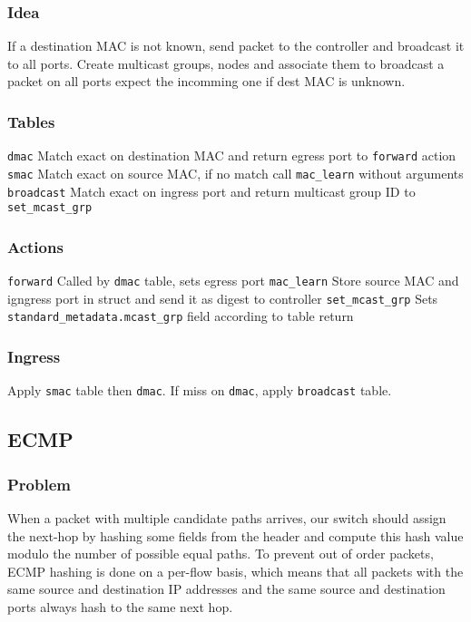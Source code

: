 \documentclass[a4paper, fontsize=8pt, landscape, DIV=1]{scrartcl}
\begin{document}
\begin{multicols*}{4}
  \subsubsection{Idea}
  If a destination MAC is not known, send packet to the controller and broadcast
  it to all ports. Create multicast groups, nodes and associate them to broadcast
  a packet on all ports expect the incomming one if dest MAC is unknown.

  \subsubsection{Tables} 
  \begin{outline}
  \1 \texttt{dmac}
    \2 Match exact on destination MAC and return egress port to \texttt{forward} action
  \1 \texttt{smac}
    \2 Match exact on source MAC, if no match call \texttt{mac\_learn} without arguments
  \1 \texttt{broadcast}
    \2 Match exact on ingress port and return multicast group ID to \texttt{set\_mcast\_grp}
  \end{outline}
  
  \subsubsection{Actions}
  \begin{outline}
  \1 \texttt{forward}
    \2 Called by \texttt{dmac} table, sets egress port
  \1 \texttt{mac\_learn}
    \2 Store source MAC and igngress port in struct and send it as digest to controller
  \1 \texttt{set\_mcast\_grp}
    \2 Sets \texttt{standard\_metadata.mcast\_grp} field according to table return
    
  \end{outline}

  \subsubsection{Ingress} 
  Apply \texttt{smac} table then \texttt{dmac}. If miss on \texttt{dmac}, apply \texttt{broadcast}
  table.


  \subsection{ECMP}
  \subsubsection{Problem} When a packet with multiple candidate paths arrives, our switch should 
  assign the next-hop by hashing some fields from the header and compute this 
  hash value modulo the number of possible equal paths. To prevent out of order 
  packets, ECMP hashing is done on a per-flow basis, which means that all packets
  with the same source and destination IP addresses and the same source and destination
  ports always hash to the same next hop.


\end{multicols*}
\end{document}
